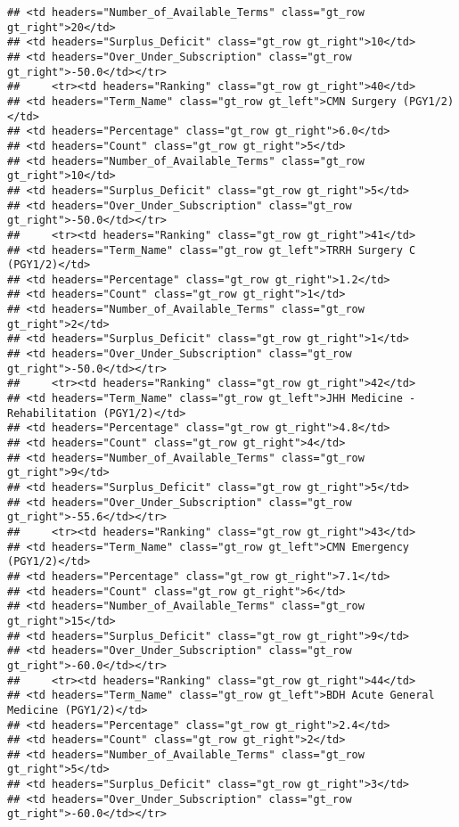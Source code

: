 \documentclass[
]{article}
\begin{document}
\begin{verbatim}
## <td headers="Number_of_Available_Terms" class="gt_row gt_right">20</td>
## <td headers="Surplus_Deficit" class="gt_row gt_right">10</td>
## <td headers="Over_Under_Subscription" class="gt_row gt_right">-50.0</td></tr>
##     <tr><td headers="Ranking" class="gt_row gt_right">40</td>
## <td headers="Term_Name" class="gt_row gt_left">CMN Surgery (PGY1/2)</td>
## <td headers="Percentage" class="gt_row gt_right">6.0</td>
## <td headers="Count" class="gt_row gt_right">5</td>
## <td headers="Number_of_Available_Terms" class="gt_row gt_right">10</td>
## <td headers="Surplus_Deficit" class="gt_row gt_right">5</td>
## <td headers="Over_Under_Subscription" class="gt_row gt_right">-50.0</td></tr>
##     <tr><td headers="Ranking" class="gt_row gt_right">41</td>
## <td headers="Term_Name" class="gt_row gt_left">TRRH Surgery C (PGY1/2)</td>
## <td headers="Percentage" class="gt_row gt_right">1.2</td>
## <td headers="Count" class="gt_row gt_right">1</td>
## <td headers="Number_of_Available_Terms" class="gt_row gt_right">2</td>
## <td headers="Surplus_Deficit" class="gt_row gt_right">1</td>
## <td headers="Over_Under_Subscription" class="gt_row gt_right">-50.0</td></tr>
##     <tr><td headers="Ranking" class="gt_row gt_right">42</td>
## <td headers="Term_Name" class="gt_row gt_left">JHH Medicine - Rehabilitation (PGY1/2)</td>
## <td headers="Percentage" class="gt_row gt_right">4.8</td>
## <td headers="Count" class="gt_row gt_right">4</td>
## <td headers="Number_of_Available_Terms" class="gt_row gt_right">9</td>
## <td headers="Surplus_Deficit" class="gt_row gt_right">5</td>
## <td headers="Over_Under_Subscription" class="gt_row gt_right">-55.6</td></tr>
##     <tr><td headers="Ranking" class="gt_row gt_right">43</td>
## <td headers="Term_Name" class="gt_row gt_left">CMN Emergency (PGY1/2)</td>
## <td headers="Percentage" class="gt_row gt_right">7.1</td>
## <td headers="Count" class="gt_row gt_right">6</td>
## <td headers="Number_of_Available_Terms" class="gt_row gt_right">15</td>
## <td headers="Surplus_Deficit" class="gt_row gt_right">9</td>
## <td headers="Over_Under_Subscription" class="gt_row gt_right">-60.0</td></tr>
##     <tr><td headers="Ranking" class="gt_row gt_right">44</td>
## <td headers="Term_Name" class="gt_row gt_left">BDH Acute General Medicine (PGY1/2)</td>
## <td headers="Percentage" class="gt_row gt_right">2.4</td>
## <td headers="Count" class="gt_row gt_right">2</td>
## <td headers="Number_of_Available_Terms" class="gt_row gt_right">5</td>
## <td headers="Surplus_Deficit" class="gt_row gt_right">3</td>
## <td headers="Over_Under_Subscription" class="gt_row gt_right">-60.0</td></tr>

\end{verbatim}
\end{document}
